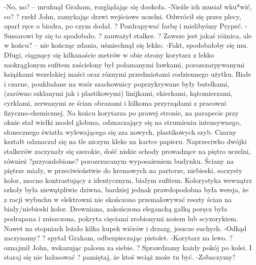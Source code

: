 \documentclass[../MAIN.tex]{subfiles}
\begin{document}
-No, no? -- mruknął Graham, rozglądając się dookoła.
-Nieźle ich musiał wku*wić, co? ? rzekł John, zamykając drzwi wejściowe uczelni. Odwrócił się przez plecy, oparł ręce o biodra, po czym dodał. ? Pozdrapywać farbę i mielibyśmy Prypeć.
-Sussarowi by się to spodobało. ? zauważył stalker. ? Zawsze jest jakaś różnica, ale w końcu? -- nie kończąc zdania, uśmiechnął się lekko.
-Fakt, spodobałoby się mu.
Długi, ciągnący się kilkanaście metrów w obie strony korytarz z lekko zaokrąglonym sufitem zaścielony był połamanymi ławkami, porozszarpywanymi książkami wszelakiej maści oraz róznymi przedmiotami codziennego użytku. Białe i czarne, poukładane na wzór szachownicy poprzykrywane były butelkami, (zarówno szklanymi jak i plastikowymi) linijkami, ekierkami, kątomierzami, cyrklami, zerwanymi ze ścian obrazami i kilkoma przyrządami z pracowni fizyczno-chemicznej.
Na końcu korytarza po prawej stronie, na parapecie przy oknie stał wielki model globusa, odznaczający się na strumieniu intensywnego, słonecznego światła wylewającego się zza nowych, plastikowych szyb. Czarny kształt odznaczał się na tle niczym kleks na kartce papieru.
Naprzeciwko dwójki stalkerów zaczynały się szerokie, dość niskie schody prowadzące na piętro uczelni, również ?przyozdobione? porozrzucanym wyposażeniem budynku. Ściany na piętrze miały, w przeciwieństwie do kremowych na parterze, niebieski, soczysty kolor, mocno kontrastujący z identycznym, białym sufitem. Kolorystyka wewnątrz szkoły była niewątpliwie dziwna, bardziej jednak prawdopodobna była wersja, że z racji wybuchu w elektrowni nie skończono przemalowywać reszty ścian na biały/niebieski kolor.
Drewniana, zakończona elegancką gałką poręcz była podrapana i zniszczona, pokryta cięciami zrobionymi nożem lub scyzorykiem. Nawet na stopniach leżało kilka kupek wiórów i drzazg, jeszcze suchych.
-Odkąd zaczynamy? ? spytał Graham, odbezpieczając pistolet.
-Korytarz na lewo. ? oznajmił John, wskazując palcem za siebie. ? Sprawdzamy każdy pokój po kolei. I staraj się nie hałasować ? pamiętaj, że ktoś wciąż może tu być.
-Zobaczymy?
\end{document}
